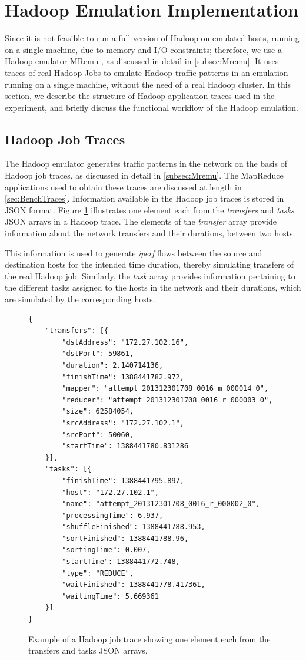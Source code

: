 \section{Hadoop Emulation Implementation} \label{sec:HadoopEmuImplementation}

Since it is not feasible to run a full version of Hadoop on emulated hosts, running on a single machine, due to memory and I/O constraints; therefore, we use a Hadoop emulator MRemu \cite{neves2015mremu}, as discussed in detail in \ref{subsec:Mremu}. It uses traces of real Hadoop Jobs to emulate Hadoop traffic patterns in an emulation running on a single machine, without the need of a real Hadoop cluster. In this section, we describe the structure of Hadoop application traces used in the experiment, and  briefly discuss the functional workflow of the Hadoop emulation.

\subsection{Hadoop Job Traces}

The Hadoop emulator generates traffic patterns in the network on the basis of Hadoop job traces, as discussed in detail in \ref{subsec:Mremu}. The MapReduce applications used to obtain these traces are discussed at length in \ref{sec:BenchTraces}. Information available in the Hadoop job traces is stored in JSON format. Figure \ref{fig:TraceExample} illustrates one element each from the \textit{transfers} and \textit{tasks} JSON arrays in a Hadoop trace. The elements of the \textit{transfer} array provide information about the network transfers and their durations, between two hosts. 

This information is used to generate \textit{iperf} flows between the source and destination hosts for the intended time duration, thereby simulating transfers of the real Hadoop job. 
Similarly, the \textit{task} array provides information pertaining to the different tasks assigned to the hosts in the network and their durations, which are simulated by the corresponding hosts.    

\begin{figure} [!ht]
\begin{lstlisting}[style=json]
{
	"transfers": [{
		"dstAddress": "172.27.102.16",
		"dstPort": 59861,
		"duration": 2.140714136,
		"finishTime": 1388441782.972,
		"mapper": "attempt_201312301708_0016_m_000014_0",
		"reducer": "attempt_201312301708_0016_r_000003_0",
		"size": 62584054,
		"srcAddress": "172.27.102.1",
		"srcPort": 50060,
		"startTime": 1388441780.831286
	}],
	"tasks": [{
		"finishTime": 1388441795.897,
		"host": "172.27.102.1",
		"name": "attempt_201312301708_0016_r_000002_0",
		"processingTime": 6.937,
		"shuffleFinished": 1388441788.953,
		"sortFinished": 1388441788.96,
		"sortingTime": 0.007,
		"startTime": 1388441772.748,
		"type": "REDUCE",
		"waitFinished": 1388441778.417361,
		"waitingTime": 5.669361
	}]
}
\end{lstlisting}
\caption{Example of a Hadoop job trace showing one element each from the transfers
	and tasks JSON arrays.} 
\label{fig:TraceExample}
\end{figure}


